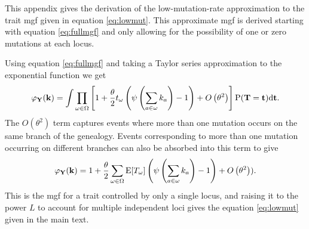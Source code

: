 This appendix gives the derivation of the low-mutation-rate approximation to the
trait mgf given in equation \eqref{eq:lowmut}. This approximate mgf is derived
starting with equation \eqref{eq:fullmgf} and only allowing for the possibility
of one or zero mutations at each locus. 

Using equation \eqref{eq:fullmgf} and taking a Taylor series approximation to
the exponential function we get
\begin{equation}
  \varphi_{\mathbf{Y}}(\mathbf{k}) =   \int \prod_{\omega \in \Omega}
  \left[1 + \frac{\theta}{2} t_{\omega} \left( \psi\left(\sum_{a \in \omega}k_{a}\right) -1 \right) +
    O\left( \theta^2 \right)\right]
  \mathrm{P}(\mathbf{T}=\mathbf{t})\mbox{d}\mathbf{t}.
\end{equation}
The $O\left( \theta^2 \right)$ term captures events where more than one mutation
occurs on the same branch of the genealogy. Events corresponding to more than
one mutation occurring on different branches can also be absorbed into this term
to give
\begin{equation}
  \label{eq:lowmutder}
  \varphi_{\mathbf{Y}}(\mathbf{k}) =
  1 + \frac{\theta}{2} \sum_{\omega \in \Omega}
  \mathrm{E}[T_\omega] \left( \psi\left( \sum_{a \in \omega} k_a\right) -1 \right) +
  O\left( \theta^2 \right)).
\end{equation}
This is the mgf for a trait controlled by only a single locus, and raising it to
the power $L$ to account for multiple independent loci gives the equation
\eqref{eq:lowmut} given in the main text. 

